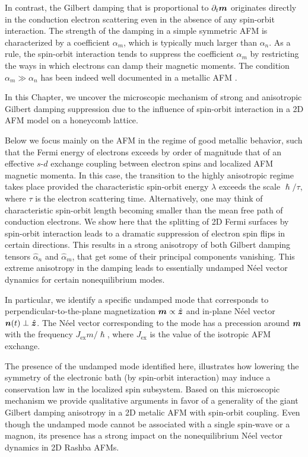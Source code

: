 In contrast, the Gilbert damping that is proportional to $\partial_t\boldsymbol{m}$ originates directly in the conduction electron scattering even in the absence of any spin-orbit interaction. The strength of the damping in a simple symmetric AFM is characterized by a coefficient $\alpha_m$, which is typically much larger than $\alpha_n$. As a rule, the spin-orbit interaction tends to suppress the coefficient $\alpha_m$ by restricting the ways in which electrons can damp their magnetic moments.  The condition $\alpha_m \gg \alpha_n$ has been indeed well documented in a metallic AFM \cite{PhysRevMaterials.1.061401, Mahfouzi2018a}. 

In this Chapter, we uncover the microscopic mechanism of strong and anisotropic Gilbert damping suppression due to the influence of spin-orbit interaction in a 2D AFM model on a honeycomb lattice. 

Below we focus mainly on the AFM in the regime of good metallic behavior, such that the Fermi energy of electrons exceeds by order of magnitude that of an effective $s$-$d$ exchange coupling between electron spins and localized AFM magnetic momenta.  In this case, the transition to the highly anisotropic regime takes place provided the characteristic spin-orbit energy $\lambda$ exceeds the scale $\hslash/\tau$, where $\tau$ is the electron scattering time. Alternatively, one may think of characteristic spin-orbit length becoming smaller than the mean free path of conduction electrons.  We show here that the splitting of 2D Fermi surfaces by spin-orbit interaction leads to a dramatic suppression of electron spin flips in certain directions. This results in a strong anisotropy of both Gilbert damping tensors $\hat{\alpha}_n$ and $\hat{\alpha}_m$, that get some of their principal components vanishing. This extreme anisotropy in the damping leads to essentially undamped N\'eel vector dynamics for certain nonequilibrium modes. 

In particular, we identify a specific undamped mode that corresponds to perpendicular-to-the-plane magnetization $\boldsymbol{m} \propto \hat{\boldsymbol{z}}$ and in-plane N\'eel vector $\boldsymbol{n}(t) \perp \hat{\boldsymbol{z}}$. The N\'eel vector corresponding to the mode has a precession around $\boldsymbol{m}$ with the frequency $J_\textrm{ex} m/\hslash$, where $J_\textrm{ex}$ is the value of the isotropic AFM exchange.

The presence of the undamped mode identified here, illustrates how lowering the symmetry of the electronic bath (by spin-orbit interaction) may induce a conservation law in the localized spin subsystem. Based on this microscopic mechanism we provide qualitative arguments in favor of a generality of the giant Gilbert damping anisotropy in a 2D metalic AFM with spin-orbit coupling. Even though the undamped mode cannot be associated with a single spin-wave or a magnon, its presence has a strong impact on the nonequilibrium N\'eel vector dynamics in 2D Rashba AFMs.

